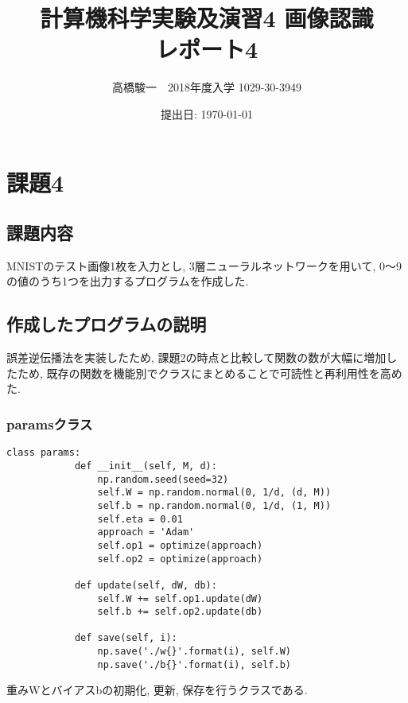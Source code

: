 \documentclass[a4j, titlepage]{jarticle}
\begin{document}
\title{計算機科学実験及演習4 画像認識　\\ \bf レポート4}
\author{高橋駿一　2018年度入学 1029-30-3949}
\date{提出日: \today} %
\maketitle

\clearpage

\section*{課題4}
\subsection*{課題内容}
MNISTのテスト画像1枚を入力とし, 3層ニューラルネットワークを用いて, 0～9の値のうち1つを出力するプログラムを作成した.

\subsection*{作成したプログラムの説明}
誤差逆伝播法を実装したため, 課題2の時点と比較して関数の数が大幅に増加したため, 既存の関数を機能別でクラスにまとめることで可読性と再利用性を高めた.
    \subsubsection{paramsクラス}
        \begin{lstlisting}[caption=パラメータWとbに関する処理 ,label=fuga]
        class params:
            def __init__(self, M, d):
                np.random.seed(seed=32)
                self.W = np.random.normal(0, 1/d, (d, M))
                self.b = np.random.normal(0, 1/d, (1, M))
                self.eta = 0.01
                approach = 'Adam'
                self.op1 = optimize(approach)
                self.op2 = optimize(approach)

            def update(self, dW, db):
                self.W += self.op1.update(dW)
                self.b += self.op2.update(db)

            def save(self, i):
                np.save('./w{}'.format(i), self.W)
                np.save('./b{}'.format(i), self.b)
        \end{lstlisting}
        重みWとバイアスbの初期化, 更新, 保存を行うクラスである.
\end{document}
